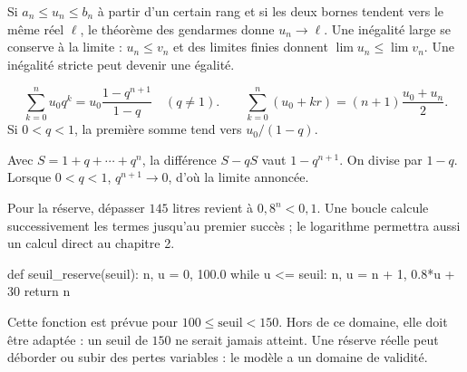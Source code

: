 Si $a_n\leq u_n\leq b_n$ à partir d'un certain rang et si les deux bornes tendent vers le même réel $\ell$, le théorème des gendarmes donne $u_n\to\ell$.
Une inégalité large se conserve à la limite : $u_n\leq v_n$ et des limites finies donnent $\lim u_n\leq\lim v_n$. Une inégalité stricte peut devenir une égalité.
\begin{propriete}
\[\sum_{k=0}^{n}u_0q^k=u_0\frac{1-q^{n+1}}{1-q}\quad(q\ne1).
\qquad\sum_{k=0}^{n}(u_0+kr)=(n+1)\frac{u_0+u_n}{2}.\]
Si $0<q<1$, la première somme tend vers $u_0/(1-q)$.
\end{propriete}
\begin{demonstration}
Avec $S=1+q+\cdots+q^n$, la différence $S-qS$ vaut $1-q^{n+1}$. On divise par $1-q$. Lorsque $0<q<1$, $q^{n+1}\to0$, d'où la limite annoncée.
\end{demonstration}
Pour la réserve, dépasser $145$ litres revient à $0{,}8^n<0{,}1$.
Une boucle calcule successivement les termes jusqu'au premier succès ; le logarithme permettra aussi un calcul direct au chapitre 2.
\begin{python}
def seuil_reserve(seuil):
    n, u = 0, 100.0
    while u <= seuil:
        n, u = n + 1, 0.8*u + 30
    return n
\end{python}
Cette fonction est prévue pour $100\leq\text{seuil}<150$. Hors de ce domaine, elle doit être adaptée : un seuil de $150$ ne serait jamais atteint. Une réserve réelle peut déborder ou subir des pertes variables : le modèle a un domaine de validité.

